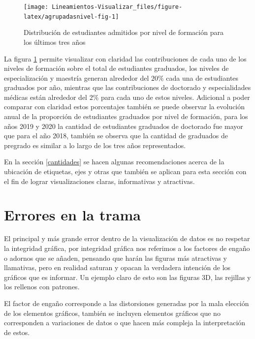 \documentclass[
]{book}
\begin{document}
\begin{figure}

{\centering \texttt{[image: Lineamientos-Visualizar\_files/figure-latex/agrupadasnivel-fig-1]} 

}

\caption{Distribución de estudiantes admitidos por nivel de formación para los últimos tres años}\label{fig:agrupadasnivel-fig}
\end{figure}

La figura \ref{fig:agrupadasnivel-fig} permite visualizar con claridad las contribuciones de cada uno de los niveles de formación sobre el total de estudiantes graduados, los niveles de especialización y maestría generan alrededor del \(20\%\) cada una de estudiantes graduados por año, mientras que las contribuciones de doctorado y especialidades médicas están alrededor del \(2\%\) para cada uno de estos niveles. Adicional a poder comparar con claridad estos porcentajes también se puede observar la evolución anual de la proporción de estudiantes graduados por nivel de formación, para los años 2019 y 2020 la cantidad de estudiantes graduados de doctorado fue mayor que para el año 2018, también se observa que la cantidad de graduados de pregrado es similar a lo largo de los tres años representados.

En la sección \ref{cantidades} se hacen algunas recomendaciones acerca de la ubicación de etiquetas, ejes y otras que también se aplican para esta sección con el fin de lograr visualizaciones claras, informativas y atractivas.

\hypertarget{errores-en-la-trama}{%
\chapter{Errores en la trama}\label{errores-en-la-trama}}

El principal y más grande error dentro de la visualización de datos es no respetar la integridad gráfica, por integridad gráfica nos referimos a los factores de engaño o adornos que se añaden, pensando que harán las figuras más atractivas y llamativas, pero en realidad saturan y opacan la verdadera intención de los gráficos que es informar. Un ejemplo claro de esto son las figuras 3D, las rejillas y los rellenos con patrones.

El factor de engaño corresponde a las distorsiones generadas por la mala elección de los elementos gráficos, también se incluyen elementos gráficos que no corresponden a variaciones de datos o que hacen más compleja la interpretación de estos.
\end{document}
